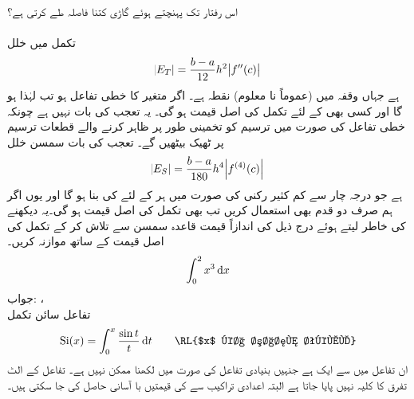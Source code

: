اس رفتار تک پہنچتے ہوئے گاڑی کتنا فاصلہ طے کرتی ہے؟
\\
\\
تکمل  میں خلل
\begin{align*}
\abs{E_T}=\frac{b-a}{12}h^2\abs{f''(c)}
\end{align*}
ہے جہاں  وقفہ  میں  (عموماً نا معلوم) نقطہ ہے۔ اگر  متغیر  کا خطی تفاعل ہو تب   لہٰذا  ہو گا اور کسی بھی  کے لئے تکمل کی اصل قیمت  ہو گی۔ یہ تعجب کی بات نہیں ہے چونکہ خطی تفاعل کی صورت میں ترسیم کو تخمینی طور پر ظاہر کرنے والے قطعات ترسیم پر ٹھیک بیٹھیں گے۔  تعجب کی بات سمسن خلل
\begin{align*}
\abs{E_S}=\frac{b-a}{180}h^4\abs{f^{(4)}(c)}
\end{align*} 
ہے جو درجہ چار سے کم کثیر رکنی    کی صورت میں ہر  کے لئے   کی بنا  ہو گا اور یوں اگر ہم صرف دو قدم بھی استعمال کریں تب بھی  تکمل کی اصل قیمت ہو گی۔یہ دیکھنے کی خاطر  لیتے ہوئے درج ذیل کی اندازاً قیمت قاعدہ سمسن سے  تلاش کر کے تکمل کی اصل قیمت کے ساتھ موازنہ کریں۔
\begin{align*}
\int_0^2x^3\dif x
\end{align*}
جواب:\quad
{}، 
\\
تفاعل سائن تکمل
\begin{align*}
\kSi(x)=\int_0^x\frac{\sin t}{t}\dif t\quad\quad\text{\RL{$x$ کا سائن تکمل}}
\end{align*}
ان تفاعل میں سے ایک ہے جنہیں بنیادی تفاعل کی صورت میں لکھنا ممکن نہیں ہے۔ تفاعل  کے الٹ تفرق کا کلیہ نہیں پایا جاتا ہے البتہ اعدادی تراکیب سے  کی قیمتیں با آسانی حاصل کی جا سکتی ہیں۔ 

